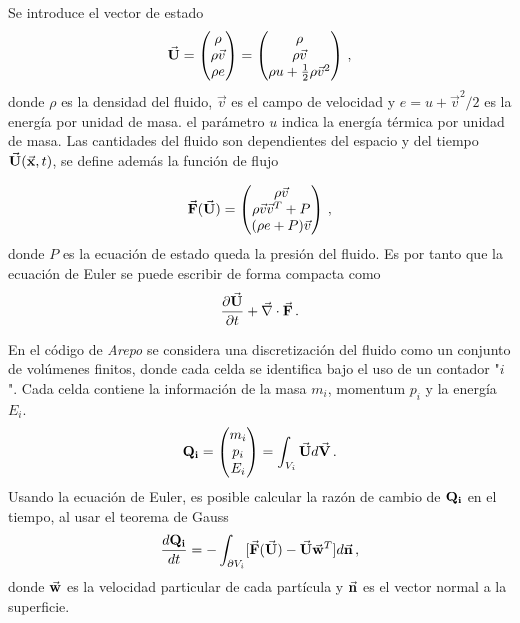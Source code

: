 Se introduce el vector de estado    
\begin{align}
    \vec{\bf{U}}= \begin{pmatrix} \rho \\ \rho\vec{v} \\ \rho e \end{pmatrix} = 
    \begin{pmatrix} \rho \\ \rho\vec{v} \\ \rho u+\frac{1}{2}\rho\vec{v}^{2} \end{pmatrix}\,,
\end{align}
donde $\rho$ es la densidad del fluido, $\vec{v}$ es el campo de velocidad y $e=u+ \vec{v}^{2}/2$ es la energía por unidad de masa. el parámetro $u$ indica la energía térmica por unidad de masa. Las cantidades del fluido son dependientes del espacio y del tiempo $\vec{\bf{U}}(\vec{\bf{x}},t)$, se define además la función de flujo

\begin{align}
    \vec{\bf{F}}(\vec{\bf{U}})=
    \begin{pmatrix} \rho\vec{v} \\ \rho\vec{v}\vec{v}^{T}+ P \\ (\rho e + P)\vec{v} \end{pmatrix}\,,
\end{align}
donde $P$ es la ecuación de estado queda la presión del fluido. Es por tanto que la ecuación de Euler se puede escribir de forma compacta como 
\begin{align}
    \frac{\partial\vec{\bf{U}}}{\partial t} + \vec{\nabla}\cdot \vec{\bf{F}}\,.
\end{align}

En el código de {\it{Arepo}} se considera una discretización del fluido como un conjunto de volúmenes finitos, donde cada celda se identifica bajo el uso de un contador "$i$". Cada celda contiene la información de la masa $m_{i}$, momentum $p_{i}$ y la energía $E_{i}$. %
\begin{align}
    {\bf{Q}_{i}} = \begin{pmatrix} m_{i} \\ p_{i} \\ E_{i} \end{pmatrix} = \int_{V_{i}} \vec{\bf{U}}d\vec{\bf{V}}\,.
\end{align}
%
Usando la ecuación de Euler, es posible calcular la razón de cambio de ${\bf{Q}_{i}}$ en el tiempo, al usar el teorema de Gauss
\begin{align}
    \frac{d{\bf{Q_{i}}}}{dt} = -\int_{\partial V_{i}}[\vec{\bf{F}}(\vec{\bf{U}})-\vec{\bf{U}}\vec{\bf{w}}^{T}]d\vec{\bf{n}}\,,
\end{align}
donde $\vec{\bf{w}}$ es la velocidad particular de cada partícula y $\vec{\bf{n}}$ es el vector normal a la superficie.

